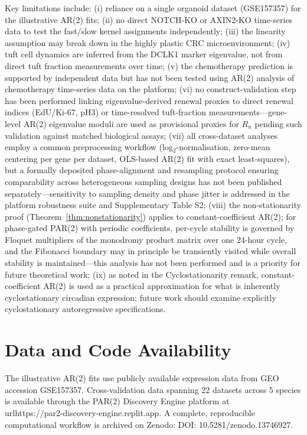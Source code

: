 \documentclass[11pt,letterpaper]{article}
\theoremstyle{definition}
\theoremstyle{remark}
\begin{document}
Key limitations include: (i) reliance on a single organoid dataset (GSE157357) for the illustrative AR(2) fits; (ii) no direct NOTCH-KO or AXIN2-KO time-series data to test the fast/slow kernel assignments independently; (iii) the linearity assumption may break down in the highly plastic CRC microenvironment; (iv) tuft cell dynamics are inferred from the DCLK1 marker eigenvalue, not from direct tuft fraction measurements over time; (v) the chemotherapy prediction is supported by independent data \citep{nguyen2025colonic, mzoughi2025chemotherapy} but has not been tested using AR(2) analysis of chemotherapy time-series data on the platform; (vi) no construct-validation step has been performed linking eigenvalue-derived renewal proxies to direct renewal indices (EdU/Ki-67, pH3) or time-resolved tuft-fraction measurements---gene-level AR(2) eigenvalue moduli are used as provisional proxies for $R_n$ pending such validation against matched biological assays; (vii) all cross-dataset analyses employ a common preprocessing workflow (log$_2$-normalisation, zero-mean centering per gene per dataset, OLS-based AR(2) fit with exact least-squares), but a formally deposited phase-alignment and resampling protocol ensuring comparability across heterogeneous sampling designs has not been published separately---sensitivity to sampling density and phase jitter is addressed in the platform robustness suite and Supplementary Table S2; (viii) the non-stationarity proof (Theorem~\ref{thm:nonstationarity}) applies to constant-coefficient AR(2); for phase-gated PAR(2) with periodic coefficients, per-cycle stability is governed by Floquet multipliers of the monodromy product matrix over one 24-hour cycle, and the Fibonacci boundary may in principle be transiently visited while overall stability is maintained---this analysis has not been performed and is a priority for future theoretical work; (ix) as noted in the Cyclostationarity remark, constant-coefficient AR(2) is used as a practical approximation for what is inherently cyclostationary circadian expression; future work should examine explicitly cyclostationary autoregressive specifications.

\section{Data and Code Availability}

The illustrative AR(2) fits use publicly available expression data from GEO accession GSE157357. Cross-validation data spanning 22 datasets across 5 species is available through the PAR(2) Discovery Engine platform at \\url{https://par2-discovery-engine.replit.app}. A complete, reproducible computational workflow is archived on Zenodo: DOI: 10.5281/zenodo.13746927.
\end{document}
